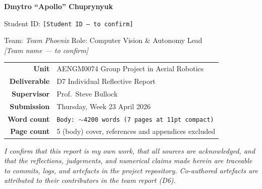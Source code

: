 \begin{titlepage}
  \vspace{1.6cm}

  {\large\bfseries Dmytro ``Apollo'' Chuprynyuk\par}
  \vspace{0.15cm}
  {\normalsize Student ID: \texttt{[Student ID --- to confirm]}\par}
  \vspace{0.15cm}
  {\normalsize Team: \textit{Team Phoenix} \textbar{} Role: Computer Vision \& Autonomy Lead\\ \footnotesize\textit{[Team name --- to confirm]}\par}

  \vspace{1.2cm}

  \begin{tabular}{rl}
    \textbf{Unit}           & AENGM0074 Group Project in Aerial Robotics \\
    \textbf{Deliverable}    & D7 \textemdash{} Individual Reflective Report \\
    \textbf{Supervisor}     & Prof.\ Steve Bullock \\
    \textbf{Submission}     & Thursday, Week 23 \textemdash{} April 2026 \\
    \textbf{Word count}     & \texttt{Body: $\sim$4200 words (7 pages at 11pt compact)} \\
    \textbf{Page count}     & 5 (body) \textbar{} cover, references and appendices excluded \\
  \end{tabular}

  \vfill

  \begin{minipage}{0.88\textwidth}
    \footnotesize\centering
    \textit{I confirm that this report is my own work, that all sources are
    acknowledged, and that the reflections, judgements, and numerical claims
    made herein are traceable to commits, logs, and artefacts in the project
    repository. Co-authored artefacts are attributed to their contributors
    in the team report (D6).}
  \end{minipage}
  \vspace{0.4cm}

\end{titlepage}

\setcounter{page}{1}
